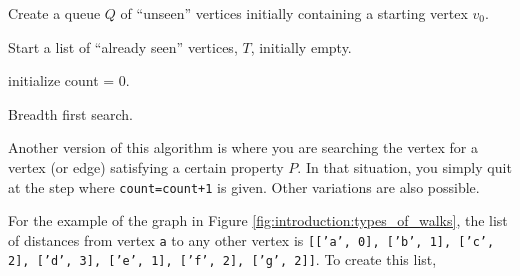 \begin{algorithm}[!htpb]
\SetLine
\dontprintsemicolon  %
\BlankLine
Create a queue $Q$ of ``unseen'' vertices initially
containing a starting vertex $v_0$. 

Start a list of ``already seen'' vertices, $T$, initially empty.

initialize count = 0.

\caption{Breadth first search.}
\label{alg:chapter2:BFS}
\end{algorithm}


Another version of this algorithm is where you are searching the 
vertex for a vertex (or edge) satisfying a certain property $P$.
In that situation, you simply quit at the step where
{\tt count=count+1} is given. Other variations are also possible.


For the example of the graph in Figure
\ref{fig:introduction:types_of_walks}, the list of distances from
vertex {\tt a} to any other vertex is 
{\tt [['a', 0], ['b', 1], ['c', 2], ['d', 3], ['e', 1], ['f', 2],
  ['g', 2]]}. To create this list, 

